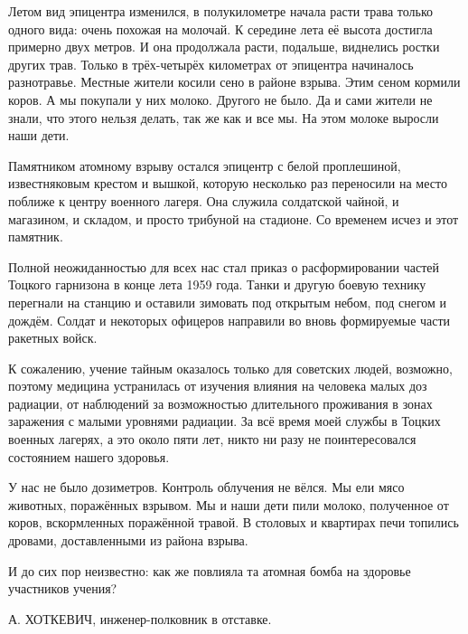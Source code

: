 Летом вид эпицентра изменился, в полукилометре начала расти трава только одного вида: очень похожая на молочай.
К середине лета её высота достигла примерно двух метров.
И она продолжала расти, подальше, виднелись ростки других трав.
Только в трёх-четырёх километрах от эпицентра начиналось разнотравье.
Местные жители косили сено в районе взрыва.
Этим сеном кормили коров.
А мы покупали у них молоко.
Другого не было.
Да и сами жители не знали, что этого нельзя делать, так же как и все мы.
На этом молоке выросли наши дети.

Памятником атомному взрыву остался эпицентр с белой проплешиной, известняковым крестом и вышкой, которую несколько раз переносили на место поближе к центру военного лагеря.
Она служила солдатской чайной, и магазином, и складом, и просто трибуной на стадионе.
Со временем исчез и этот памятник.

Полной неожиданностью для всех нас стал приказ о расформировании частей Тоцкого гарнизона в конце лета 1959 года.
Танки и другую боевую технику перегнали на станцию и оставили зимовать под открытым небом, под снегом и дождём.
Солдат и некоторых офицеров направили во вновь формируемые части ракетных войск.

К сожалению, учение тайным оказалось только для советских людей, возможно, поэтому медицина устранилась от изучения влияния на человека малых доз радиации, от наблюдений за возможностью длительного проживания в зонах заражения с малыми уровнями радиации.
За всё время моей службы в Тоцких военных лагерях, а это около пяти лет, никто ни разу не поинтересовался состоянием нашего здоровья.

У нас не было дозиметров.
Контроль облучения не вёлся.
Мы ели мясо животных, поражённых взрывом.
Мы и наши дети пили молоко, полученное от коров, вскормленных поражённой травой.
В столовых и квартирах печи топились дровами, доставленными из района взрыва.

И до сих пор неизвестно: как же повлияла та атомная бомба на здоровье участников учения?

\begin{flushright}
А. ХОТКЕВИЧ, 
инженер-полковник 
в отставке.
\end{flushright}
